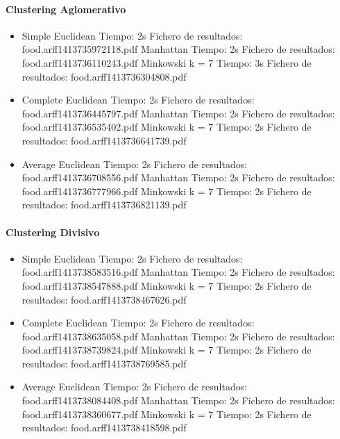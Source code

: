\documentclass[11pt, titlepage,a4paper]{article}
\begin{document}
\paragraph{Clustering Aglomerativo\\}
\begin{itemize}
  \item Simple
  	\subitem Euclidean
  		\subsubitem Tiempo: 2s
  		\subsubitem Fichero de resultados: food.arff1413735972118.pdf
	\subitem Manhattan
		\subsubitem Tiempo: 2s
  		\subsubitem Fichero de resultados: food.arff1413736110243.pdf
	\subitem Minkowski k = 7
		\subsubitem Tiempo: 3s 
  		\subsubitem Fichero de resultados: food.arff1413736304808.pdf 	
  \item Complete
	\subitem Euclidean
  		\subsubitem Tiempo: 2s
  		\subsubitem Fichero de resultados: food.arff1413736445797.pdf 
	\subitem Manhattan
		\subsubitem Tiempo: 2s
  		\subsubitem Fichero de resultados: food.arff1413736535402.pdf 
	\subitem Minkowski k = 7
		\subsubitem Tiempo: 2s
  		\subsubitem Fichero de resultados: food.arff1413736641739.pdf 	
  \item Average
  	\subitem Euclidean
  		\subsubitem Tiempo: 2s
  		\subsubitem Fichero de resultados: food.arff1413736708556.pdf 
	\subitem Manhattan
		\subsubitem Tiempo: 2s
  		\subsubitem Fichero de resultados: food.arff1413736777966.pdf
	\subitem Minkowski k = 7
		\subsubitem Tiempo: 2s
  		\subsubitem Fichero de resultados: food.arff1413736821139.pdf	
\end{itemize}

\paragraph{Clustering Divisivo\\}
\begin{itemize}
  \item Simple
  	\subitem Euclidean
  		\subsubitem Tiempo: 2s
  		\subsubitem Fichero de resultados: food.arff1413738583516.pdf
	\subitem Manhattan
		\subsubitem Tiempo: 2s
  		\subsubitem Fichero de resultados: food.arff1413738547888.pdf
	\subitem Minkowski k = 7
		\subsubitem Tiempo: 2s
  		\subsubitem Fichero de resultados: food.arff1413738467626.pdf	
  \item Complete
	\subitem Euclidean
  		\subsubitem Tiempo: 2s
  		\subsubitem Fichero de resultados: food.arff1413738635058.pdf
	\subitem Manhattan
		\subsubitem Tiempo: 2s
  		\subsubitem Fichero de resultados: food.arff1413738739824.pdf
	\subitem Minkowski k = 7
		\subsubitem Tiempo: 2s
  		\subsubitem Fichero de resultados: food.arff1413738769585.pdf
  \item Average
  	\subitem Euclidean
  		\subsubitem Tiempo: 2s
  		\subsubitem Fichero de resultados: food.arff1413738084408.pdf
	\subitem Manhattan
		\subsubitem Tiempo: 2s
  		\subsubitem Fichero de resultados: food.arff1413738360677.pdf
	\subitem Minkowski k = 7
		\subsubitem Tiempo: 2s
  		\subsubitem Fichero de resultados: food.arff1413738418598.pdf	
\end{itemize}
\end{document}
